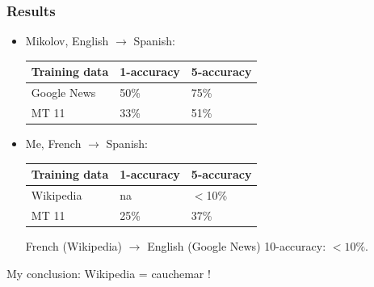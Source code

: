 \documentclass{beamer}
\begin{document}
\begin{frame}

\frametitle{Results}

\begin{itemize}
\item Mikolov, English $\rightarrow$ Spanish: 
\begin{table}
\begin{tabular}{l l l}
\toprule
\textbf{Training data} & \textbf{1-accuracy} & \textbf{5-accuracy}\\
\midrule
Google News & 50\% & 75\% \\
MT 11 & 33\% & 51\% \\
\bottomrule
\end{tabular}
\end{table}


\item Me, French $\rightarrow$ Spanish: 
\begin{table}
\begin{tabular}{l l l}
\toprule
\textbf{Training data} & \textbf{1-accuracy} & \textbf{5-accuracy}\\
\midrule
Wikipedia & na & $<$10\% \\
MT 11 & 25\% & 37\% \\
\bottomrule
\end{tabular}
\end{table}

\pause

French (Wikipedia) $\rightarrow$ English (Google News) 10-accuracy: $<10\%$.




\end{itemize}

\pause 

My conclusion: Wikipedia = cauchemar !



\end{frame}
\end{document}
